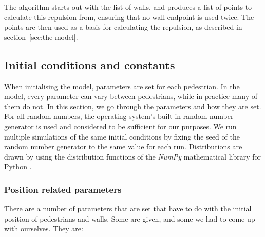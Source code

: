 The algorithm starts out with the list of walls, and produces a list of points 
to calculate this repulsion from, ensuring that no wall endpoint is used 
twice. The points are then used as a basis for calculating the repulsion, as 
described in section~\ref{sec:the-model}.

\subsection{Initial conditions and constants}
\label{sec:init-cond}
When initialising the model, parameters are set for each pedestrian. In the 
model, every parameter can vary between pedestrians, while in practice many of them 
do not. In this section, we go through the parameters and how they are set.  
For all random numbers, the operating system's built-in random number 
generator is used and considered to be sufficient for our purposes. We run 
multiple simulations of the same initial conditions by fixing the seed of the 
random number generator to the same value for each run. Distributions are 
drawn by using the distribution functions of the \emph{NumPy} mathematical 
library for Python \cite{numpy}.

\subsubsection{Position related parameters}
There are a number of parameters that are set that have to do with the initial 
position of pedestrians and walls. Some are given, and some we had to come up
with ourselves. They are:

